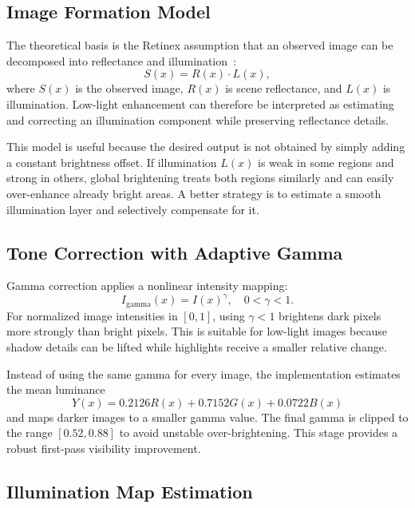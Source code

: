 \documentclass[11pt,a4paper]{article}
\begin{document}
\subsection{Image Formation Model}

The theoretical basis is the Retinex assumption that an observed image can be decomposed into reflectance and illumination~\cite{land1971retinex}:
\begin{equation}
  S(x) = R(x) \cdot L(x),
\end{equation}
where $S(x)$ is the observed image, $R(x)$ is scene reflectance, and $L(x)$ is illumination. Low-light enhancement can therefore be interpreted as estimating and correcting an illumination component while preserving reflectance details.

This model is useful because the desired output is not obtained by simply adding a constant brightness offset. If illumination $L(x)$ is weak in some regions and strong in others, global brightening treats both regions similarly and can easily over-enhance already bright areas. A better strategy is to estimate a smooth illumination layer and selectively compensate for it.

\subsection{Tone Correction with Adaptive Gamma}

Gamma correction applies a nonlinear intensity mapping:
\begin{equation}
  I_{\mathrm{gamma}}(x)=I(x)^\gamma,\quad 0 < \gamma < 1.
\end{equation}
For normalized image intensities in $[0,1]$, using $\gamma<1$ brightens dark pixels more strongly than bright pixels. This is suitable for low-light images because shadow details can be lifted while highlights receive a smaller relative change.

Instead of using the same gamma for every image, the implementation estimates the mean luminance
\begin{equation}
  Y(x)=0.2126R(x)+0.7152G(x)+0.0722B(x)
\end{equation}
and maps darker images to a smaller gamma value. The final gamma is clipped to the range $[0.52,0.88]$ to avoid unstable over-brightening. This stage provides a robust first-pass visibility improvement.

\subsection{Illumination Map Estimation}
\end{document}
